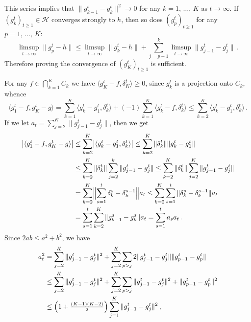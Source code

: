 \documentclass[a4paper]{article}
\newcommand{\Hcal}{\mathcal{H}}
\begin{document}
This series implies that $\|g^t_{k-1} - g^t_k\|^2 \to 0$ for any $k=1,\,\ldots,\,K$
as $t\to \infty$. If $(g^t_k)_{t\geq 1}\in \Hcal$ converges strongly to $h$, then
so does $(g^t_p)_{t\geq 1}$ for any $p=1,\,\ldots,\,K$:
\begin{equation*}
  \limsup_{t\to \infty} \| g^t_p - h \|
    \leq \limsup_{t\to \infty} \|g^t_k - h\|
      + \sum_{j=p+1}^k \limsup_{t\to \infty} \| g^t_{j-1} - g^t_j \|
    \,.
\end{equation*}
Therefore proving the convergence of $(g^t_K)_{t\geq 1}$ is sufficient.

For any $f\in \bigcap_{k=1}^K C_k$ we have $\langle g^t_K - f, \delta^t_K \rangle
\geq 0$, since $g^t_k$ is a projection onto $C_k$, whence
\begin{equation*}
  \langle g^t_1 - f, g^t_K - g \rangle
    = \sum_{k=1}^K \langle g^t_k - g^t_1, \delta^t_k \rangle
      + (-1) \sum_{k=1}^K \langle g^t_k - f, \delta^t_k \rangle
    \leq \sum_{k=2}^K \langle g^t_k - g^t_1, \delta^t_k \rangle
      \,.
\end{equation*}
If we let $a_t = \sum_{j=2}^K \| g^t_{j-1} - g^t_j \|$, then we get
\begin{align*}
  \bigl\lvert \langle g^t_1 - f, g^t_K - g \rangle \bigr\rvert
    &\leq \sum_{k=2}^K \bigl\lvert \langle g^t_k - g^t_1, \delta^t_k \rangle \bigr\rvert
    \leq \sum_{k=2}^K \|\delta^t_k\| \| g^t_k - g^t_1 \|
    \\
    &\leq \sum_{k=2}^K \|\delta^t_k\| \sum_{j=2}^k \| g^t_{j-1} - g^t_j \|
    \leq \sum_{k=2}^K \|\delta^t_k\| \sum_{j=2}^K \| g^t_{j-1} - g^t_j \|
    \\
    &= \sum_{k=2}^K \Bigl\|\sum_{s=1}^t \delta^s_k - \delta^{s-1}_k \Bigr\| a_t
    \leq \sum_{k=2}^K \sum_{s=1}^t \|\delta^s_k - \delta^{s-1}_k \| a_t
    \\
    &= \sum_{s=1}^t \sum_{k=2}^K \|g^s_{k-1} - g^s_k \| a_t
    = \sum_{s=1}^t a_s a_t
      \,.
\end{align*}
Since $2 a b \leq a^2 + b^2$, we have
\begin{align*}
  a^2_t
    &= \sum_{j=2}^K \| g^t_{j-1} - g^t_j \|^2
      + \sum_{j=2}^K \sum_{p > j} 2 \| g^t_{j-1} - g^t_j \| \| g^t_{p-1} - g^t_p \|
    \\
    &\leq \sum_{j=2}^K \| g^t_{j-1} - g^t_j \|^2
        + \sum_{j=2}^K \sum_{p > j} \| g^t_{j-1} - g^t_j \|^2 + \| g^t_{p-1} - g^t_p \|^2
    \\
    &\leq \Bigl(1+\tfrac{(K-1)(K-2)}{2}\Bigr) \sum_{j=1}^K \| g^t_{j-1} - g^t_j \|^2
    \,,
\end{align*}
\end{document}
